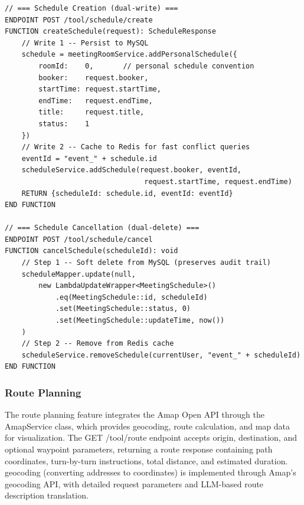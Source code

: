 \vspace{3mm}

\begin{table}[H]
\small\singlespacing
\centering
\caption{Pseudocode --- Schedule Dual-Write Pattern (MySQL + Redis Consistency)}
\label{tab:pseudocode-dual-write}
\vspace{2mm}

\begin{lstlisting}
// === Schedule Creation (dual-write) ===
ENDPOINT POST /tool/schedule/create
FUNCTION createSchedule(request): ScheduleResponse
    // Write 1 -- Persist to MySQL
    schedule = meetingRoomService.addPersonalSchedule({
        roomId:    0,       // personal schedule convention
        booker:    request.booker,
        startTime: request.startTime,
        endTime:   request.endTime,
        title:     request.title,
        status:    1
    })
    // Write 2 -- Cache to Redis for fast conflict queries
    eventId = "event_" + schedule.id
    scheduleService.addSchedule(request.booker, eventId,
                                 request.startTime, request.endTime)
    RETURN {scheduleId: schedule.id, eventId: eventId}
END FUNCTION

// === Schedule Cancellation (dual-delete) ===
ENDPOINT POST /tool/schedule/cancel
FUNCTION cancelSchedule(scheduleId): void
    // Step 1 -- Soft delete from MySQL (preserves audit trail)
    scheduleMapper.update(null,
        new LambdaUpdateWrapper<MeetingSchedule>()
            .eq(MeetingSchedule::id, scheduleId)
            .set(MeetingSchedule::status, 0)
            .set(MeetingSchedule::updateTime, now())
    )
    // Step 2 -- Remove from Redis cache
    scheduleService.removeSchedule(currentUser, "event_" + scheduleId)
END FUNCTION
\end{lstlisting}
\end{table}


\subsubsection{Route Planning}

The route planning feature integrates the Amap Open API through the AmapService class, which provides geocoding, route calculation, and map data for visualization. The GET /tool/route endpoint accepts origin, destination, and optional waypoint parameters, returning a route response containing path coordinates, turn-by-turn instructions, total distance, and estimated duration. geocoding (converting addresses to coordinates) is implemented through Amap's geocoding API, with detailed request parameters and LLM-based route description translation.

